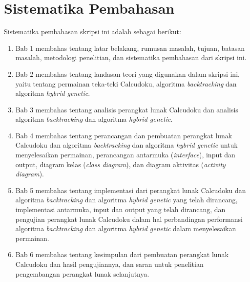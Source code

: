 \section{Sistematika Pembahasan}
\label{sec:sispem}
Sistematika pembahasan skripsi ini adalah sebagai berikut:
\begin{enumerate}
\item Bab 1 membahas tentang latar belakang, rumusan masalah, tujuan, batasan masalah, metodologi penelitian, dan sistematika pembahasan dari skripsi ini.
\item Bab 2 membahas tentang landasan teori yang digunakan dalam skripsi ini, yaitu tentang permainan teka-teki Calcudoku, algoritma \textit{backtracking} dan algoritma \textit{hybrid genetic}.
\item Bab 3 membahas tentang analisis perangkat lunak Calcudoku dan analisis algoritma \textit{backtracking} dan algoritma \textit{hybrid genetic}.
\item Bab 4 membahas tentang perancangan dan pembuatan perangkat lunak Calcudoku dan algoritma \textit{backtracking} dan algoritma \textit{hybrid genetic} untuk menyelesaikan permainan, perancangan antarmuka (\textit{interface}), input dan output, diagram kelas (\textit{class diagram}), dan diagram aktivitas (\textit{activity diagram}).
\item Bab 5 membahas tentang implementasi dari perangkat lunak Calcudoku dan algoritma \textit{backtracking} dan algoritma \textit{hybrid genetic} yang telah dirancang, implementasi antarmuka, input dan output yang telah dirancang, dan pengujian perangkat lunak Calcudoku dalam hal perbandingan performansi algoritma \textit{backtracking} dan algoritma \textit{hybrid genetic} dalam menyelesaikan permainan.
\item Bab 6 membahas tentang kesimpulan dari pembuatan perangkat lunak Calcudoku dan hasil pengujiannya, dan saran untuk penelitian pengembangan perangkat lunak selanjutnya.
\end{enumerate}